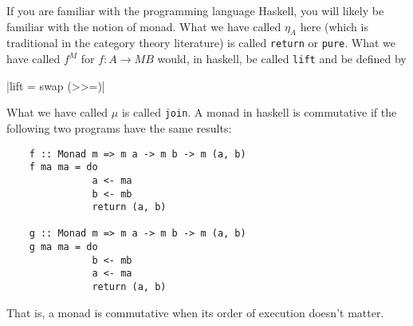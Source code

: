 \documentclass[DynamicalBook]{subfiles}
\begin{document}
\begin{remark}\label{rmk.haskell_do}
  If you are familiar with the programming language Haskell, you will likely be
  familiar with the notion of monad. What we have called $\eta_A$ here (which is
  traditional in the category theory literature) is called
  \texttt{return} or \texttt{pure}. What we have
  called $f^M$ for $f : A \to MB$ would, in haskell, be called
  \texttt{lift} and be defined by

  |lift = swap (>>=)|

  What we have called $\mu$ is called \texttt{join}. A monad in haskell is commutative if the following two programs have the same
  results:
  \begin{verbatim}
    f :: Monad m => m a -> m b -> m (a, b)
    f ma ma = do
               a <- ma
               b <- mb
               return (a, b)

    g :: Monad m => m a -> m b -> m (a, b)
    g ma ma = do
               b <- mb
               a <- ma
               return (a, b)
  \end{verbatim}
  That is, a monad is commutative when its order of execution doesn't matter. 
\end{remark}
\end{document}
